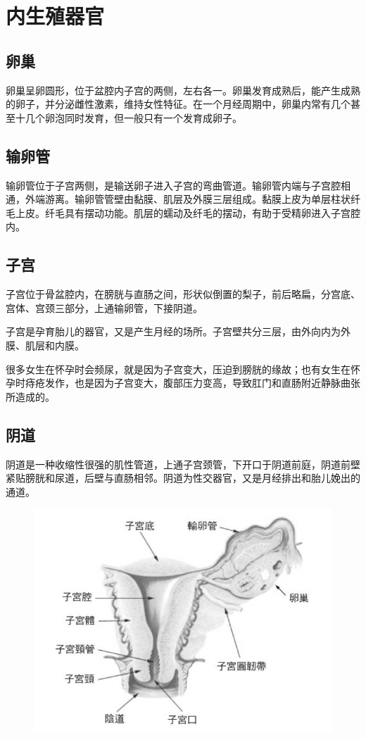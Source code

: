 \documentclass[12pt,UTF8]{ctexbook}
\begin{document}
\section{内生殖器官}

\subsection{卵巢}

卵巢呈卵圆形，位于盆腔内子宫的两侧，左右各一。卵巢发育成熟后，能产生成熟的卵子，并分泌雌性激素，维持女性特征。在一个月经周期中，卵巢内常有几个甚至十几个卵泡同时发育，但一般只有一个发育成卵子。

\subsection{输卵管}

输卵管位于子宫两侧，是输送卵子进入子宫的弯曲管道。输卵管内端与子宫腔相通，外端游离。输卵管管壁由黏膜、肌层及外膜三层组成。黏膜上皮为单层柱状纤毛上皮。纤毛具有摆动功能。肌层的蠕动及纤毛的摆动，有助于受精卵进入子宫腔内。

\subsection{子宫}

子宫位于骨盆腔内，在膀胱与直肠之间，形状似倒置的梨子，前后略扁，分宫底、宫体、宫颈三部分，上通输卵管，下接阴道。

子宫是孕育胎儿的器官，又是产生月经的场所。子宫壁共分三层，由外向内为外膜、肌层和内膜。

很多女生在怀孕时会频尿，就是因为子宫变大，压迫到膀胱的缘故；也有女生在怀孕时痔疮发作，也是因为子宫变大，腹部压力变高，导致肛门和直肠附近静脉曲张所造成的。

\subsection{阴道}

阴道是一种收缩性很强的肌性管道，上通子宫颈管，下开口于阴道前庭，阴道前壁紧贴膀胱和尿道，后壁与直肠相邻。阴道为性交器官，又是月经排出和胎儿娩出的通道。

\begin{figure}[htbp]
	\centering
	\includegraphics[width=0.7\linewidth]{3}
	\caption{}
\end{figure}
\end{document}
